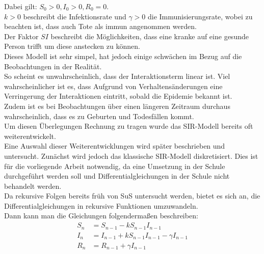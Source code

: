 Dabei gilt: $S_0 > 0, I_0 > 0, R_0 = 0$.\\
$k > 0$ beschreibt die Infektionsrate und $\gamma > 0$ die Immunisierungsrate, wobei zu beachten ist, dass auch Tote als immun angenommen werden. \\
Der Faktor $SI$ beschreibt die Möglichkeiten, dass eine kranke auf eine gesunde Person trifft um diese anstecken zu können.\\  
Dieses Modell ist sehr simpel, hat jedoch einige schwächen im Bezug auf die Beobachtungen in der Realität.\\
So scheint es unwahrscheinlich, dass der Interaktionsterm linear ist. Viel wahrscheinlicher ist es, dass Aufgrund von Verhaltensänderungen eine Verringerung der Interaktionen eintritt, sobald die Epidemie bekannt ist.\\
Zudem ist es bei Beobachtungen über einen längeren Zeitraum durchaus wahrscheinlich, dass es zu Geburten und Todesfällen kommt.\\
Um diesen Überlegungen Rechnung zu tragen wurde das SIR-Modell bereits oft weiterentwickelt.\\
Eine Auswahl dieser Weiterentwicklungen wird später beschrieben und untersucht. Zunächst wird jedoch das klassische SIR-Modell diskretisiert. Dies ist für die vorliegende Arbeit notwendig, da eine Umsetzung in der Schule durchgeführt werden soll und Differentialgleichungen in der Schule nicht behandelt werden.\\
 Da rekursive Folgen bereits früh von SuS untersucht werden, bietet es sich an, die Differentialgleichungen in rekursive Funktionen umzuwandeln.\\
  Dann kann man die Gleichungen folgendermaßen beschreiben:
  \begin{align}
  S_n &= S_{n-1}- kS_{n-1}I_{n-1}\\
  I_n &= I_{n-1}+ kS_{n-1}I_{n-1}- \gamma I_{n-1}\\
  R_n &= R_{n-1}+ \gamma I_{n-1}
  \end{align}


